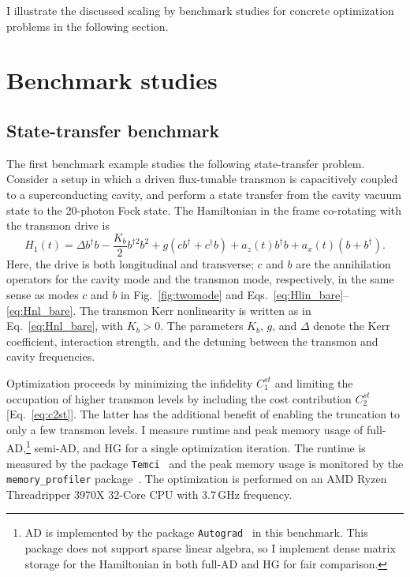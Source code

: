 I illustrate the discussed scaling by benchmark studies for concrete optimization problems in the following section.


\section{Benchmark studies}
\label{sec:benchmarks}

\subsection{State-transfer benchmark}

The first benchmark example studies the following state-transfer problem. Consider a setup in which a driven flux-tunable transmon is capacitively coupled to a superconducting cavity, and perform a state transfer from the cavity vacuum state to the 20-photon Fock state. The Hamiltonian in the frame co-rotating with the transmon drive is
\begin{equation}
\label{eq:fockH}
    H_1(t)=\Delta b^\dagger b-\frac{K_b}{2}b^{\dagger 2}b^2+g(cb^\dagger+c^\dagger b)+a_{z}(t)b^\dagger b
    +a_{x}(t)(b+b^\dagger).
\end{equation}
Here, the drive is both longitudinal and transverse; $c$ and $b$ are the annihilation operators for the cavity mode and the transmon mode, respectively, in the same sense as modes $c$ and $b$ in Fig.~\ref{fig:twomode} and Eqs.~\eqref{eq:Hlin_bare}--\eqref{eq:Hnl_bare}. The transmon Kerr nonlinearity is written as in Eq.~\eqref{eq:Hnl_bare}, with $K_b>0$. The parameters $K_b$, $g$, and $\Delta$ denote the Kerr coefficient, interaction strength, and the detuning between the transmon and cavity frequencies. 
 
Optimization proceeds by minimizing the infidelity $C_1^{st}$ and limiting the occupation of higher transmon levels by including the cost contribution $C_2^{st}$ [Eq.~\eqref{eq:c2st}]. The latter has the additional benefit of enabling the truncation to only a few transmon levels. I measure runtime and peak memory usage of full-AD,\footnote{AD is implemented by the package \texttt{Autograd}~\cite{maclaurin2015autograd} in this benchmark. This package does not support sparse linear algebra, so I implement dense matrix storage for the Hamiltonian in both full-AD and HG for fair comparison.} semi-AD, and HG for a single optimization iteration. The runtime is measured by the package \texttt{Temci}~\cite{temci} and
the peak memory usage is monitored by the \texttt{memory\_profiler} package~\cite{memory}. The optimization is performed on an AMD Ryzen Threadripper 3970X 32-Core CPU with 3.7\,GHz frequency. 


